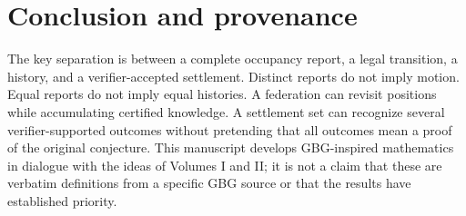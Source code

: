 \documentclass[11pt]{article}
\theoremstyle{definition}
\begin{document}
\section{Conclusion and provenance}
The key separation is between a complete occupancy report, a legal transition, a history, and a verifier-accepted settlement. Distinct reports do not imply motion. Equal reports do not imply equal histories. A federation can revisit positions while accumulating certified knowledge. A settlement set can recognize several verifier-supported outcomes without pretending that all outcomes mean a proof of the original conjecture. This manuscript develops GBG-inspired mathematics in dialogue with the ideas of Volumes I and II; it is not a claim that these are verbatim definitions from a specific GBG source or that the results have established priority.
\end{document}
